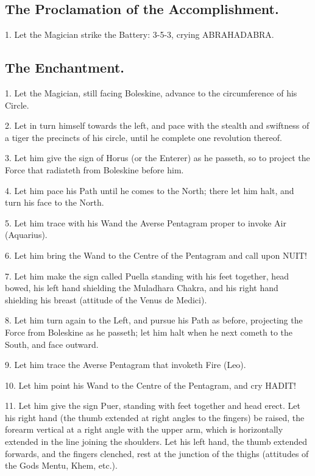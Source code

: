 \subsection*{The Proclamation of the Accomplishment.}

1. Let the Magician strike the Battery: 3-5-3, crying ABRAHADABRA.

\subsection*{The Enchantment.}

1. Let the Magician, still facing Boleskine, advance to the circumference of his Circle.

2. Let in turn himself towards the left, and pace with the stealth and swiftness of a tiger the precincts of his circle, until he complete one revolution thereof.

3. Let him give the sign of Horus (or the Enterer) as he passeth, so to project the Force that radiateth from Boleskine before him.

4. Let him pace his Path until he comes to the North; there let him halt, and turn his face to the North.

5. Let him trace with his Wand the Averse Pentagram proper to invoke Air (Aquarius).

6. Let him bring the Wand to the Centre of the Pentagram and call upon NUIT!

7. Let him make the sign called Puella standing with his feet together, head bowed, his left hand shielding the Muladhara Chakra, and his right hand shielding his breast (attitude of the Venus de Medici).

8. Let him turn again to the Left, and pursue his Path as before, projecting the Force from Boleskine as he passeth; let him halt when he next cometh to the South, and face outward.

9. Let him trace the Averse Pentagram that invoketh Fire (Leo).

10. Let him point his Wand to the Centre of the Pentagram, and cry HADIT!

11. Let him give the sign Puer, standing with feet together and head erect. Let his right hand (the thumb extended at right angles to the fingers) be raised, the forearm vertical at a right angle with the upper arm, which is horizontally extended in the line joining the shoulders. Let his left hand, the thumb extended forwards, and the fingers clenched, rest at the junction of the thighs (attitudes of the Gods Mentu, Khem, etc.).

